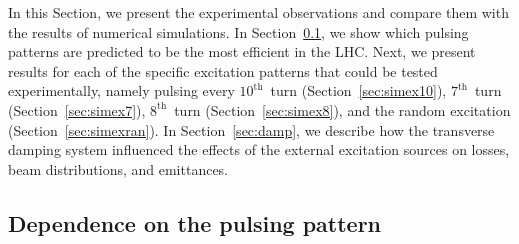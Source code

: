 \documentclass[%
 reprint,
 amsmath,amssymb,
 aps,
prstab,
longbibliography
]{revtex4-1}
\begin{document}
In this Section, we present the experimental observations and compare
them with the results of numerical simulations.  In
Section~\ref{sec:pattern}, we show which pulsing patterns are
predicted to be the most efficient in the LHC.  Next, we present
results for each of the specific excitation patterns that could be
tested experimentally, namely pulsing every $10^{\mathrm{th}}$~turn
(Section~\ref{sec:simex10}), $7^{\mathrm{th}}$~turn
(Section~\ref{sec:simex7}), $8^{\mathrm{th}}$~turn
(Section~\ref{sec:simex8}), and the random excitation
(Section~\ref{sec:simexran}).  In Section~\ref{sec:damp}, we describe
how the transverse damping system influenced the effects of the
external excitation sources on losses, beam distributions, and
emittances.


\subsection{Dependence on the pulsing pattern}
\label{sec:pattern}
\end{document}
